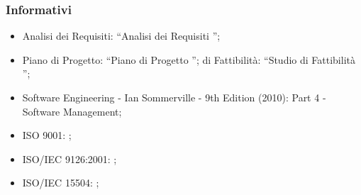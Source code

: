 		\subsubsection{Informativi}
			\begin{itemize}
				\item Analisi dei Requisiti: “Analisi dei Requisiti \lastversion”;
				\item Piano di Progetto: “Piano di Progetto \lastversion”;
				\itemStudio di Fattibilità: “Studio di Fattibilità \lastversion”;
				\item Software Engineering - Ian Sommerville - 9th Edition (2010): Part 4 - Software Management;
				\item ISO 9001: ;
				\item ISO/IEC 9126:2001: ;
				\item ISO/IEC 15504: ;
			\end{itemize}